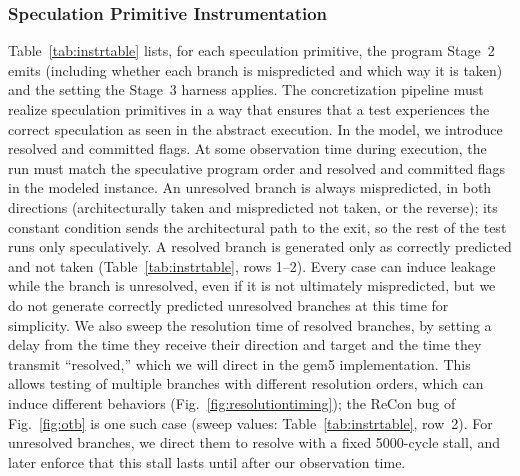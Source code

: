 \subsubsection{Speculation Primitive Instrumentation}
Table~\ref{tab:instrtable} lists, for each speculation primitive, the program Stage~2 emits (including whether each branch is mispredicted and which way it is taken) and the setting the Stage~3 harness applies.
The concretization pipeline must realize speculation primitives in a way that ensures that a test experiences the correct speculation as seen in the abstract execution. In the model, we introduce resolved and committed flags. At some observation time during execution, the run must match the speculative program order and resolved and committed flags in the modeled instance. An unresolved branch is always mispredicted, in both directions (architecturally taken and mispredicted not taken, or the reverse); its constant condition sends the architectural path to the exit, so the rest of the test runs only speculatively. A resolved branch is generated only as correctly predicted and not taken
\notebr
{}
\notebr
(Table~\ref{tab:instrtable}, rows 1--2). Every case can induce leakage while the branch is unresolved, even if it is not ultimately mispredicted, but we do not generate correctly predicted unresolved branches at this time for simplicity.
We also sweep the resolution time of resolved branches, by setting a delay from the time they receive their direction and target and the time they transmit ``resolved,'' which we will direct in the gem5 implementation. This allows testing of multiple branches with different resolution orders, which can induce different behaviors (Fig.~\ref{fig:resolutiontiming}); the ReCon bug of Fig.~\ref{fig:otb} is one such case (sweep values: Table~\ref{tab:instrtable}, row~2). For unresolved branches, we direct them to resolve with a fixed 5000-cycle stall, and later enforce that this stall lasts until after our observation time.
